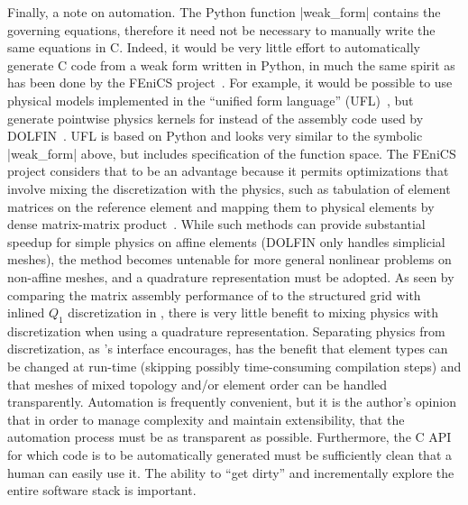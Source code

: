 Finally, a note on automation.
The Python function \pyverb|weak_form| contains the governing equations, therefore it need not be necessary to manually write the same equations in C.
Indeed, it would be very little effort to automatically generate C code from a weak form written in Python, in much the same spirit as has been done by the FEniCS project~\citep{fenicsproject}.
For example, it would be possible to use physical models implemented in the ``unified form language'' (UFL)~\citep{alnaes2009unified}, but generate pointwise physics kernels for {\Dohp} instead of the assembly code used by DOLFIN~\citep{logg2010dolfin}.
UFL is based on Python and looks very similar to the symbolic \pyverb|weak_form| above, but includes specification of the function space.
The FEniCS project considers that to be an advantage because it permits optimizations that involve mixing the discretization with the physics, such as tabulation of element matrices on the reference element and mapping them to physical elements by dense matrix-matrix product~\citep{kirby2005optimizing}.
While such methods can provide substantial speedup for simple physics on affine elements (DOLFIN only handles simplicial meshes), the method becomes untenable for more general nonlinear problems on non-affine meshes, and a quadrature representation must be adopted.
As seen by comparing the matrix assembly performance of {\Dohp} to the structured grid with inlined $Q_1$ discretization in , there is very little benefit to mixing physics with discretization when using a quadrature representation.
Separating physics from discretization, as \Dohp's interface encourages, has the benefit that element types can be changed at run-time (skipping possibly time-consuming compilation steps) and that meshes of mixed topology and/or element order can be handled transparently.
Automation is frequently convenient, but it is the author's opinion that in order to manage complexity and maintain extensibility, that the automation process must be as transparent as possible.
Furthermore, the C API for which code is to be automatically generated must be sufficiently clean that a human can easily use it.
The ability to ``get dirty'' and incrementally explore the entire software stack is important.


